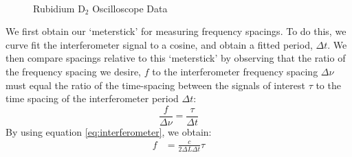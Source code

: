 \documentclass[12pt]{article}
\begin{document}
\begin{figure}%
	\centering
	\,
	\caption{Rubidium D$_2$ Oscilloscope Data}%
	\label{fig:RbOsc}%
\end{figure}

We first obtain our `meterstick' for measuring frequency spacings.  To do this, we curve fit the interferometer signal to a cosine, and obtain a fitted period, $\Delta t$.  We then compare spacings relative to this `meterstick' by observing that the ratio of the frequency spacing we desire, $f$ to the interferometer frequency spacing $\Delta \nu$ must equal the ratio of the time-spacing between the signals of interest $\tau$ to the time spacing of the interferometer period $\Delta t$:
$$ \frac{f}{\Delta \nu}= \frac{\tau}{\Delta t}$$
By using equation \ref{eq:interferometer}, we obtain:
\begin{align}
	f &= \frac{c}{2\Delta L \Delta t}\tau \label{eq:meterstick}
\end{align}
\end{document}
